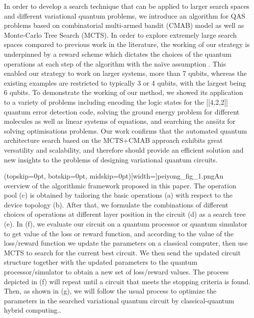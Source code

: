 \documentclass{ieeeaccess}
\begin{document}
In order to develop a search technique that can be applied to larger search spaces and different variational quantum problems, we introduce an algorithm for QAS problems based on combinatorial multi-armed bandit (CMAB) model as well as Monte-Carlo Tree Search (MCTS). In order to explore extremely large search spaces compared to previous work in the literature, the working of our strategy is underpinned by a reward scheme which dictates the choices of the quantum operations at each step of the algorithm with the na\"ive assumption \cite{CMAB_RTS}. This enabled our strategy to work on larger systems, more than 7 qubits, whereas the existing examples \cite{zhang2021differentiable, chen2021quantum, kuo2021quantum, zhang2021differentiable, du2020quantum, zhang2021neural} are restricted to typically 3 or 4 qubits, with the largest being 6 qubits. To demonstrate the working of our method, we showed its application to a variety of problems including encoding the logic states for the [[4,2,2]] quantum error detection code, solving the ground energy problem for different molecules as well as linear systems of equations, and searching the ans\"atz for solving optimisations problems. Our work confirms that the automated quantum architecture search based on the MCTS+CMAB approach exhibits great versatility and scalability, and therefore should provide an efficient solution and new insights to the problems of designing variational quantum circuits.

\Figure[ht!](topskip=0pt, botskip=0pt, midskip=0pt)[width=\textwidth]{peiyong_fig_1.png}{An overview of the algorithmic framework proposed in this paper. The operation pool (c) is obtained by tailoring the basic operations (a) with respect to the device topology (b). After that, we formulate the combinations of different choices of operations at different layer position in the circuit (d) as a search tree (e). In (f), we evaluate our circuit on a quantum processor or quantum simulator to get value of the loss or reward function, and according to the value of the loss/reward function we update the parameters on a classical computer, then use MCTS to search for the current best circuit. We then send the updated circuit structure together with the updated parameters to the quantum processor/simulator to obtain a new set of loss/reward values. The process depicted in (f) will repeat until a circuit that meets the stopping criteria is found. Then, as shown in (g), we will follow the usual process to optimize the parameters in the searched variational quantum circuit by classical-quantum hybrid computing..\label{fig:overview}}
\end{document}
